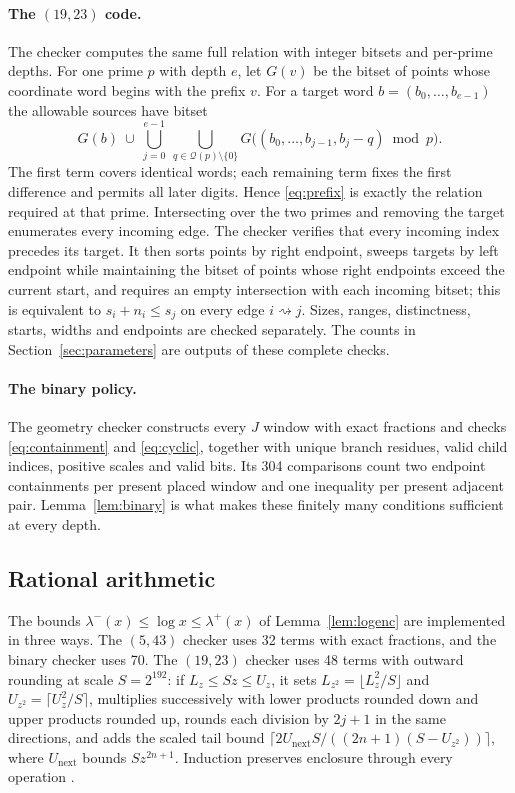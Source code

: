 \documentclass[11pt]{article}
\theoremstyle{definition}
\theoremstyle{remark}
\newcommand{\QR}{\mathcal Q}
\newcommand{\sto}{\rightsquigarrow}
\begin{document}
\paragraph{The $(19,23)$ code.} The checker computes the same full relation
with integer bitsets and per-prime depths. For one prime $p$ with depth $e$,
let $G(v)$ be the bitset of points whose coordinate word begins with the
prefix $v$. For a target word $b=(b_0,\ldots,b_{e-1})$ the allowable sources
have bitset
\begin{equation}\label{eq:prefix}
 G(b)\ \cup\ \bigcup_{j=0}^{e-1}\ \bigcup_{q\in\QR(p)\setminus\{0\}}
 G\bigl((b_0,\ldots,b_{j-1},b_j-q)\bmod p\bigr).
\end{equation}
The first term covers identical words; each remaining term fixes the first
difference and permits all later digits. Hence \eqref{eq:prefix} is exactly
the relation required at that prime. Intersecting over the two primes and
removing the target enumerates every incoming edge. The checker verifies that
every incoming index precedes its target. It then sorts points by right
endpoint, sweeps targets by left endpoint while maintaining the bitset of
points whose right endpoints exceed the current start, and requires an empty
intersection with each incoming bitset; this is equivalent to $s_i+n_i\le s_j$
on every edge $i\sto j$. Sizes, ranges, distinctness, starts, widths and
endpoints are checked separately. The counts in
Section~\ref{sec:parameters} are outputs of these complete checks.

\paragraph{The binary policy.} The geometry checker constructs every $J$
window with exact fractions and checks \eqref{eq:containment} and
\eqref{eq:cyclic}, together with unique branch residues, valid child indices,
positive scales and valid bits. Its 304 comparisons count two endpoint
containments per present placed window and one inequality per present
adjacent pair. Lemma~\ref{lem:binary} is what makes these finitely many
conditions sufficient at every depth.

\subsection{Rational arithmetic}\label{sec:arithmetic}
The bounds $\lambda^-(x)\le\log x\le\lambda^+(x)$ of Lemma~\ref{lem:logenc}
are implemented in three ways. The $(5,43)$ checker uses 32 terms with exact
fractions, and the binary checker uses 70. The $(19,23)$ checker uses 48 terms
with outward rounding at scale $S=2^{192}$: if $L_z\le Sz\le U_z$, it sets
$L_{z^2}=\lfloor L_z^2/S\rfloor$ and $U_{z^2}=\lceil U_z^2/S\rceil$,
multiplies successively with lower products rounded down and upper products
rounded up, rounds each division by $2j+1$ in the same directions, and adds the
scaled tail bound
$\bigl\lceil2U_{\mathrm{next}}S/((2n+1)(S-U_{z^2}))\bigr\rceil$, where
$U_{\mathrm{next}}$ bounds $Sz^{2n+1}$. Induction preserves enclosure through
every operation \cite{MooreKearfottCloud2009}.
\end{document}
